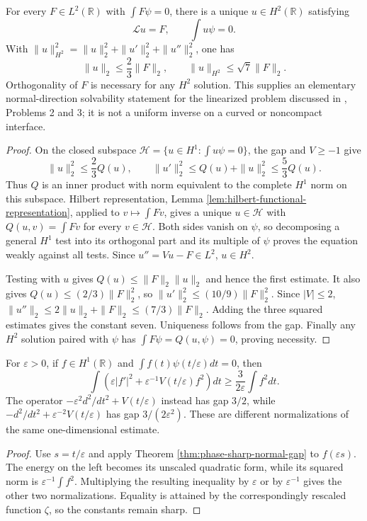 \begin{theorem}\label{thm:phase-orthogonal-normal-inverse}
For every $F\in L^2(\mathbb R)$ with $\int F\psi=0$, there is a unique $u\in H^2(\mathbb R)$ satisfying
\[
 \mathscr Lu=F,\qquad \int u\psi=0.
\]
With $\|u\|_{H^2}^2=\|u\|_2^2+\|u'\|_2^2+\|u''\|_2^2$, one has
\[
 \|u\|_2\leq\frac23\|F\|_2,\qquad
 \|u\|_{H^2}\leq\sqrt7\|F\|_2.
\]
Orthogonality of $F$ is necessary for any $H^2$ solution. This supplies an elementary normal-direction solvability statement for the linearized problem discussed in \cite{ChAC}, Problems 2 and 3; it is not a uniform inverse on a curved or noncompact interface.
\end{theorem}
\begin{proof}
On the closed subspace $\mathcal H=\{u\in H^1:\int u\psi=0\}$, the gap and $V\geq-1$ give
\[
 \|u\|_2^2\leq\frac23Q(u),\qquad
 \|u'\|_2^2\leq Q(u)+\|u\|_2^2\leq\frac53Q(u).
\]
Thus $Q$ is an inner product with norm equivalent to the complete $H^1$ norm on this subspace. Hilbert representation, Lemma \ref{lem:hilbert-functional-representation}, applied to $v\mapsto\int Fv$, gives a unique $u\in\mathcal H$ with $Q(u,v)=\int Fv$ for every $v\in\mathcal H$. Both sides vanish on $\psi$, so decomposing a general $H^1$ test into its orthogonal part and its multiple of $\psi$ proves the equation weakly against all tests. Since $u''=Vu-F\in L^2$, $u\in H^2$.

Testing with $u$ gives $Q(u)\leq\|F\|_2\|u\|_2$ and hence the first estimate. It also gives $Q(u)\leq(2/3)\|F\|_2^2$, so $\|u'\|_2^2\leq(10/9)\|F\|_2^2$. Since $|V|\leq2$, $\|u''\|_2\leq2\|u\|_2+\|F\|_2\leq(7/3)\|F\|_2$. Adding the three squared estimates gives the constant seven. Uniqueness follows from the gap. Finally any $H^2$ solution paired with $\psi$ has $\int F\psi=Q(u,\psi)=0$, proving necessity.
\end{proof}

\begin{corollary}\label{cor:phase-scaled-normal-gap}
For $\varepsilon>0$, if $f\in H^1(\mathbb R)$ and $\int f(t)\psi(t/\varepsilon)dt=0$, then
\[
 \int\left(\varepsilon|f'|^2+\varepsilon^{-1}V(t/\varepsilon)f^2\right)dt
 \geq\frac3{2\varepsilon}\int f^2dt.
\]
The operator $-\varepsilon^2d^2/dt^2+V(t/\varepsilon)$ instead has gap $3/2$, while $-d^2/dt^2+\varepsilon^{-2}V(t/\varepsilon)$ has gap $3/(2\varepsilon^2)$. These are different normalizations of the same one-dimensional estimate.
\end{corollary}
\begin{proof}
Use $s=t/\varepsilon$ and apply Theorem \ref{thm:phase-sharp-normal-gap} to $f(\varepsilon s)$. The energy on the left becomes its unscaled quadratic form, while its squared norm is $\varepsilon^{-1}\int f^2$. Multiplying the resulting inequality by $\varepsilon$ or by $\varepsilon^{-1}$ gives the other two normalizations. Equality is attained by the correspondingly rescaled function $\zeta$, so the constants remain sharp.
\end{proof}
